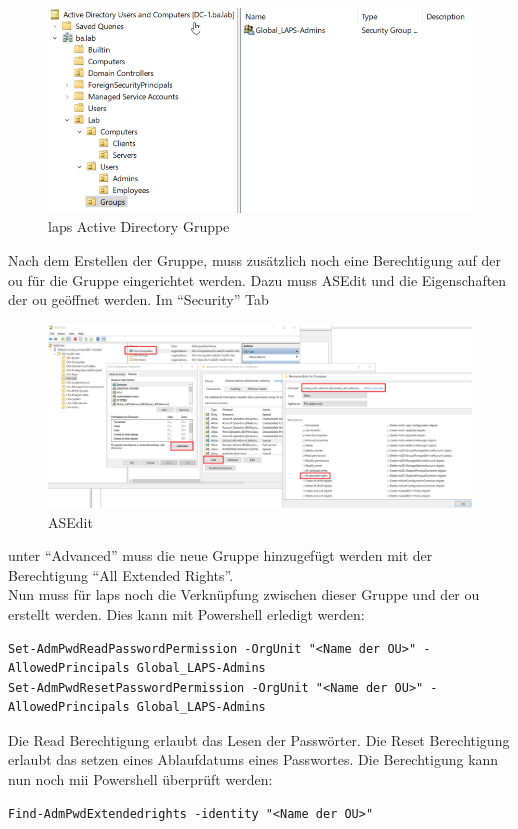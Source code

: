 \begin{figure}[H]
    \centering
    \includegraphics[width=\linewidth]{../img/LAPS/Laps-Admins.png}
    \caption{\acrshort{laps} Active Directory Gruppe}
\end{figure}

Nach dem Erstellen der Gruppe, muss zusätzlich noch eine Berechtigung auf der \acrshort{ou} für die Gruppe eingerichtet werden.
Dazu muss ASEdit und die Eigenschaften der \acrshort{ou} geöffnet werden. Im ``Security'' Tab
\begin{figure}[H]
    \centering
    \includegraphics[width=0.9\linewidth]{../img/LAPS/ASEdit.png}
    \caption{ASEdit}
\end{figure}
unter ``Advanced'' muss die neue Gruppe hinzugefügt werden mit der Berechtigung ``All Extended Rights''.\\

Nun muss für \acrshort{laps} noch die Verknüpfung zwischen dieser Gruppe und der \acrshort{ou} erstellt werden.
Dies kann mit Powershell erledigt werden:
\begin{lstlisting}
Set-AdmPwdReadPasswordPermission -OrgUnit "<Name der OU>" -AllowedPrincipals Global_LAPS-Admins
Set-AdmPwdResetPasswordPermission -OrgUnit "<Name der OU>" -AllowedPrincipals Global_LAPS-Admins
\end{lstlisting}
Die Read Berechtigung erlaubt das Lesen der Passwörter.
Die Reset Berechtigung erlaubt das setzen eines Ablaufdatums eines Passwortes.
Die Berechtigung kann nun noch mii Powershell überprüft werden:
\begin{lstlisting}
Find-AdmPwdExtendedrights -identity "<Name der OU>"
\end{lstlisting}


